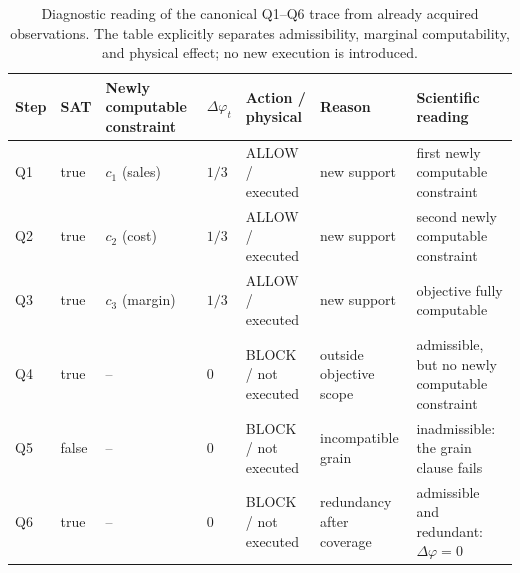 \begin{table}[!t]
\centering
\caption{Diagnostic reading of the canonical Q1--Q6 trace from already acquired observations. The table explicitly separates admissibility, marginal computability, and physical effect; no new execution is introduced.}
\label{tab:q1-q6-diagnostic}
\scriptsize
\setlength{\tabcolsep}{2.4pt}
\renewcommand{\arraystretch}{1.10}
\begin{tabularx}{\textwidth}{@{}p{0.55cm}p{0.72cm}p{2.35cm}p{1.05cm}p{2.15cm}p{2.55cm}X@{}}
\toprule
Step & SAT & Newly computable constraint & $\Delta\varphi_t$ & Action / physical & Reason & Scientific reading \\
\midrule
Q1 & true & $c_1$ (sales) & $1/3$ & ALLOW / executed & new support & first newly computable constraint \\
Q2 & true & $c_2$ (cost) & $1/3$ & ALLOW / executed & new support & second newly computable constraint \\
Q3 & true & $c_3$ (margin) & $1/3$ & ALLOW / executed & new support & objective fully computable \\
Q4 & true & -- & $0$ & BLOCK / not executed & outside objective scope & admissible, but no newly computable constraint \\
Q5 & false & -- & $0$ & BLOCK / not executed & incompatible grain & inadmissible: the grain clause fails \\
Q6 & true & -- & $0$ & BLOCK / not executed & redundancy after coverage & admissible and redundant: $\Delta\varphi=0$ \\
\bottomrule
\end{tabularx}
\normalsize
\end{table}
